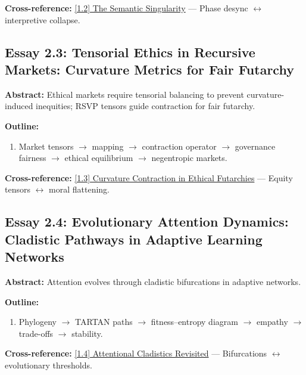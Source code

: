 \documentclass[12pt,a4paper]{article}
\begin{document}
\textbf{Cross-reference:} \hyperref[sec:essay1-2]{[1.2] The Semantic Singularity} --- Phase desync $\leftrightarrow$ interpretive collapse.

\subsection{Essay 2.3: Tensorial Ethics in Recursive Markets: Curvature Metrics for Fair Futarchy}
\label{sec:essay2-3}

\textbf{Abstract:} Ethical markets require tensorial balancing to prevent curvature-induced inequities; RSVP tensors guide contraction for fair futarchy.

\textbf{Outline:}
\begin{enumerate}
\item Market tensors $\to$ mapping $\to$ contraction operator $\to$ governance fairness $\to$ ethical equilibrium $\to$ negentropic markets.
\end{enumerate}

\textbf{Cross-reference:} \hyperref[sec:essay1-3]{[1.3] Curvature Contraction in Ethical Futarchies} --- Equity tensors $\leftrightarrow$ moral flattening.

\subsection{Essay 2.4: Evolutionary Attention Dynamics: Cladistic Pathways in Adaptive Learning Networks}
\label{sec:essay2-4}

\textbf{Abstract:} Attention evolves through cladistic bifurcations in adaptive networks.

\textbf{Outline:}
\begin{enumerate}
\item Phylogeny $\to$ TARTAN paths $\to$ fitness--entropy diagram $\to$ empathy $\to$ trade-offs $\to$ stability.
\end{enumerate}

\textbf{Cross-reference:} \hyperref[sec:essay1-4]{[1.4] Attentional Cladistics Revisited} --- Bifurcations $\leftrightarrow$ evolutionary thresholds.

\end{document}
